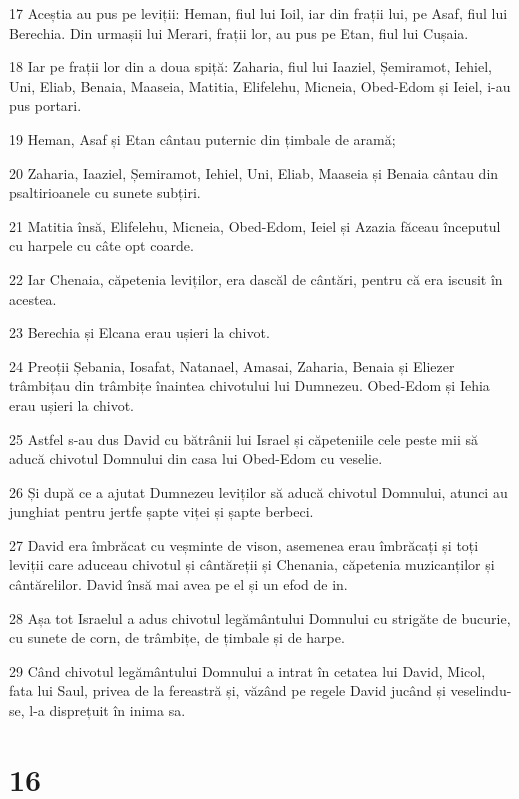 \par 17 Aceștia au pus pe leviții: Heman, fiul lui Ioil, iar din frații lui, pe Asaf, fiul lui Berechia. Din urmașii lui Merari, frații lor, au pus pe Etan, fiul lui Cușaia.
\par 18 Iar pe frații lor din a doua spiță: Zaharia, fiul lui Iaaziel, Șemiramot, Iehiel, Uni, Eliab, Benaia, Maaseia, Matitia, Elifelehu, Micneia, Obed-Edom și Ieiel, i-au pus portari.
\par 19 Heman, Asaf și Etan cântau puternic din țimbale de aramă;
\par 20 Zaharia, Iaaziel, Șemiramot, Iehiel, Uni, Eliab, Maaseia și Benaia cântau din psaltirioanele cu sunete subțiri.
\par 21 Matitia însă, Elifelehu, Micneia, Obed-Edom, Ieiel și Azazia făceau începutul cu harpele cu câte opt coarde.
\par 22 Iar Chenaia, căpetenia leviților, era dascăl de cântări, pentru că era iscusit în acestea.
\par 23 Berechia și Elcana erau ușieri la chivot.
\par 24 Preoții Șebania, Iosafat, Natanael, Amasai, Zaharia, Benaia și Eliezer trâmbițau din trâmbițe înaintea chivotului lui Dumnezeu. Obed-Edom și Iehia erau ușieri la chivot.
\par 25 Astfel s-au dus David cu bătrânii lui Israel și căpeteniile cele peste mii să aducă chivotul Domnului din casa lui Obed-Edom cu veselie.
\par 26 Și după ce a ajutat Dumnezeu leviților să aducă chivotul Domnului, atunci au junghiat pentru jertfe șapte viței și șapte berbeci.
\par 27 David era îmbrăcat cu veșminte de vison, asemenea erau îmbrăcați și toți leviții care aduceau chivotul și cântăreții și Chenania, căpetenia muzicanților și cântărelilor. David însă mai avea pe el și un efod de in.
\par 28 Așa tot Israelul a adus chivotul legământului Domnului cu strigăte de bucurie, cu sunete de corn, de trâmbițe, de țimbale și de harpe.
\par 29 Când chivotul legământului Domnului a intrat în cetatea lui David, Micol, fata lui Saul, privea de la fereastră și, văzând pe regele David jucând și veselindu-se, l-a disprețuit în inima sa.

\chapter{16}

